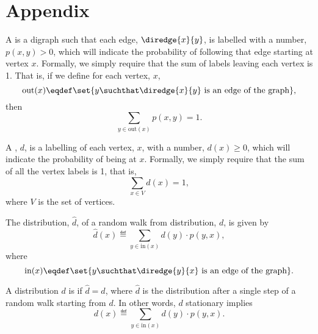 \documentclass[handout]{mcs}
\begin{document}




\section*{Appendix}
\newcommand{\vout}[1]{\text{out}(#1)}
\newcommand{\vin}[1]{\text{in}(#1)}
\newcommand{\odeg}[1]{\text{out-degree}(#1)}
\newcommand{\ideg}[1]{\text{in-degree}(#1)}

A  is a digraph such that each edge,
$\diredge{x}{y}$, is labelled with a number, $p(x,y) > 0$, which will
indicate the probability of following that edge starting at vertex $x$.
Formally, we simply require that the sum of labels leaving each vertex is
1.  That is, if we define for each vertex, $x$,
\[
\vout{x} \eqdef \set{y \suchthat \diredge{x}{y} \text{ is an edge of the
    graph}},
\]
then
\[
\sum_{y \in \vout{x}} p(x,y) = 1.
\]

A , $d$, is a labelling of each vertex, $x$, with a
number, $d(x) \geq 0$, which will indicate the probability of being at $x$.
Formally, we simply require that the sum of all the vertex labels is 1,
that is,
\[
\sum_{x \in V} d(x) = 1,
\]
where $V$ is the set of vertices.

The distribution, $\widehat{d}$,  of a random walk from
distribution, $d$, is given by
\[
\widehat{d}(x) \eqdef \sum_{y \in \vin{x}} d(y) \cdot p(y,x),
\]
where
\[
\vin{x} \eqdef \set{y \suchthat \diredge{y}{x} \text{ is an edge of the
    graph}}.
\]

A distribution $d$ is  if $\widehat{d} = d$, where 
$\widehat{d}$ is the distribution after a single step of a random walk
starting from $d$.
In other words, $d$ stationary implies
\[
d(x) \eqdef \sum_{y \in \vin{x}} d(y) \cdot p(y,x).
\]
\end{document}
